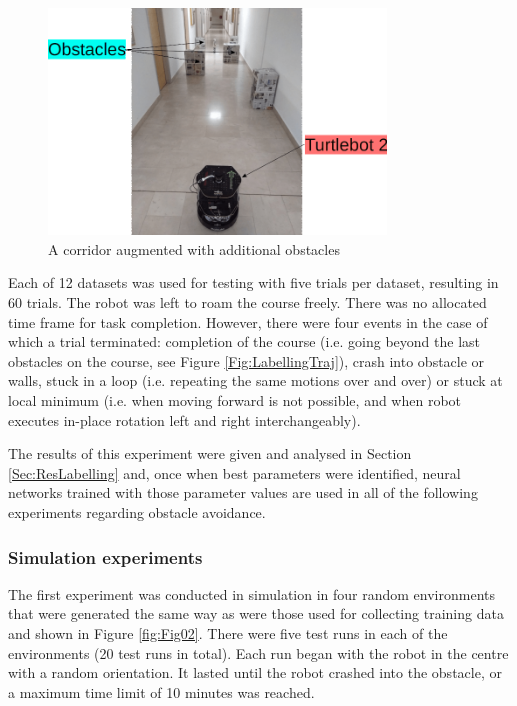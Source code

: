 \begin{figure}
\centering
\includegraphics[width=0.8\textwidth]{slike/Fig03_05.png}
\caption{A corridor augmented with additional obstacles}
\label{Fig:Hodnik}
\end{figure}

Each of 12 datasets was used for testing with five trials per dataset, resulting in 60 trials. The robot was left to roam the course freely. There was no allocated time frame for task completion. However, there were four events in the case of which a trial terminated: completion of the course (i.e. going beyond the last obstacles on the course, see Figure \ref{Fig:LabellingTraj}), crash into obstacle or walls, stuck in a loop (i.e. repeating the same motions over and over) or stuck at local minimum (i.e. when moving forward is not possible, and when robot executes in-place rotation left and right interchangeably).

The results of this experiment were given and analysed in Section \ref{Sec:ResLabelling} and, once when best parameters were identified, neural networks trained with those parameter values are used in all of the following experiments regarding obstacle avoidance.

\subsubsection{Simulation experiments}

The first experiment was conducted in simulation in four random environments that were generated the same way as were those used for collecting training data and shown in Figure \ref{fig:Fig02}. There were five test runs in each of the environments (20 test runs in total). Each run began with the robot in the centre with a random orientation. It lasted until the robot crashed into the obstacle, or a maximum time limit of 10 minutes was reached.

